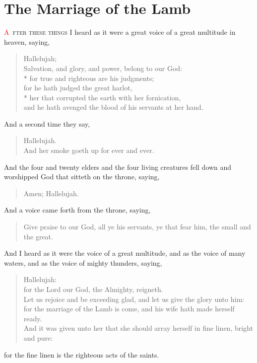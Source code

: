 
\chapter{The Marriage of the Lamb}
\lettrine[lines=3,slope=0.5em]{\textcolor{red}{A}}{\ fter these things} I heard as it were a great voice of a great multitude in heaven, saying,
\zz \begin{verse}
Hallelujah;\\
Salvation, and glory, and power, belong to our God:\\*\vin
{}for true and righteous are his judgments;\\
for he hath judged the great harlot,\\*\vin
her that corrupted the earth with her fornication,\\
and he hath avenged the blood of his servants at her hand.
\end{verse}

\noindent
{} And a second time they say,
\begin{verse}
Hallelujah.\\
And her smoke goeth up for ever and ever.
\end{verse}
 And the four and twenty elders and the four living creatures fell down and worshipped God that sitteth on the throne, saying, 
\begin{verse}
Amen; Hallelujah. 
\end{verse}
 And a voice came forth from the throne, saying,
\begin{verse}
Give praise to our God, all ye his servants, ye that fear him, the small and the great.
\end{verse}
 And I heard as it were the voice of a great multitude, and as the voice of many waters, and as the voice of mighty thunders, saying,
\begin{verse}
Hallelujah:\\
for the Lord our God, the Almighty, reigneth.\\
Let us rejoice and be exceeding glad, and let us give the glory unto him:\\
for the marriage of the Lamb is come, and his wife hath made herself ready.\\
And it was given unto her that she should array herself in fine linen, bright and pure:
\end{verse}
for the fine linen is the righteous acts of the saints.

